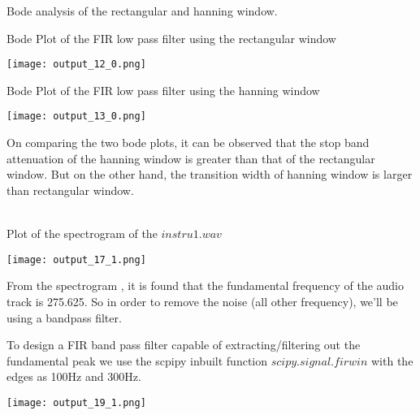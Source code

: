 \documentclass[12pt, a4 paper]{article}
\begin{document}
Bode analysis of the rectangular and hanning window.

\solution

Bode Plot of the FIR low pass filter using the rectangular window

\begin{center}
    \begin{wrapfigure}
    \centering
    \texttt{[image: output\_12\_0.png]}
    \end{wrapfigure}
\end{center}

Bode Plot of the FIR low pass filter using the hanning window 

\begin{center}
    \begin{wrapfigure}
    \centering
    \texttt{[image: output\_13\_0.png]}
    \end{wrapfigure}
\end{center}

On comparing the two bode plots, it can be observed that the stop band attenuation of the hanning window is greater than that of the rectangular window. But on the other hand, the transition width of hanning window is larger than rectangular window.

\\

Plot of the spectrogram of the $instru1.wav$

\begin{center}
    \begin{wrapfigure}
    \centering
    \texttt{[image: output\_17\_1.png]}
    \end{wrapfigure}
\end{center}

From the spectrogram , it is found that the fundamental frequency of the audio track is 275.625. So in order to remove the noise (all other frequency), we'll be using a bandpass filter.

To design a FIR band pass filter capable of extracting/filtering out the fundamental peak we use the scpipy inbuilt function $scipy.signal.firwin$ with the edges as 100Hz and 300Hz. 

\begin{center}
    \begin{wrapfigure}
    \centering
    \texttt{[image: output\_19\_1.png]}
    \end{wrapfigure}
\end{center}
\end{document}
